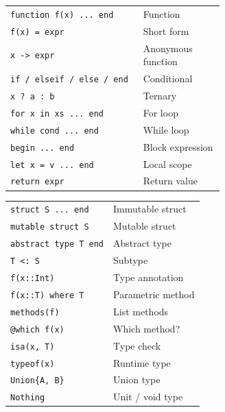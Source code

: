 \documentclass[10pt]{extarticle}
\begin{document}
\begin{multicols}{2}

\begin{tabularx}{\linewidth}{@{}>{\raggedright\arraybackslash}p{0.62\linewidth}@{\enspace}Y@{}}
\texttt{function f(x) ... end}      & Function \\
\texttt{f(x) = expr}                & Short form \\
\texttt{x -> expr}                   & Anonymous function \\
\texttt{if / elseif / else / end}   & Conditional \\
\texttt{x ? a : b}                   & Ternary \\
\texttt{for x in xs ... end}        & For loop \\
\texttt{while cond ... end}         & While loop \\
\texttt{begin ... end}               & Block expression \\
\texttt{let x = v ... end}          & Local scope \\
\texttt{return expr}                 & Return value \\
\end{tabularx}

\begin{tabularx}{\linewidth}{@{}l@{\enspace}Y@{}}
\texttt{struct S ... end}            & Immutable struct \\
\texttt{mutable struct S}            & Mutable struct \\
\texttt{abstract type T end}         & Abstract type \\
\texttt{T <: S}                      & Subtype \\
\texttt{f(x::Int)}                   & Type annotation \\
\texttt{f(x::T) where T}            & Parametric method \\
\texttt{methods(f)}                  & List methods \\
\texttt{@which f(x)}                & Which method? \\
\texttt{isa(x, T)}                   & Type check \\
\texttt{typeof(x)}                   & Runtime type \\
\texttt{Union\{A, B\}}              & Union type \\
\texttt{Nothing}                     & Unit / void type \\
\end{tabularx}


\end{multicols}
\end{document}
